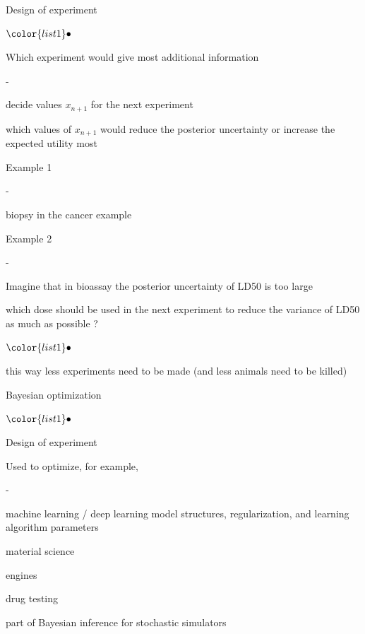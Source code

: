 \documentclass[t]{beamer}
\newenvironment{list1}{
   \begin{list}{$\color{list1}\bullet$}{\itemsep=6pt}}{
  \end{list}}
\newenvironment{list2}{
  \begin{list}{-}{\baselineskip=12pt\itemsep=2pt}}{
  \end{list}}
\begin{document}
\begin{frame}
  
  {\Large\color{navyblue} Design of experiment}

  \begin{list1}
  \item Which experiment would give most additional information
    \begin{list2}
    \item decide values $x_{n+1}$ for the next experiment
    \item which values of $x_{n+1}$ would reduce the posterior
      uncertainty or increase the expected utility most
    \end{list2}
  \item<2-> Example 1
    \begin{list2}
      \item biopsy in the cancer example
    \end{list2}
  \item<3-> Example 2
    \begin{list2}
    \item Imagine that in bioassay the posterior uncertainty of LD50 is too large
    \item which dose should be used in the next experiment to reduce
      the variance of LD50 as much as possible ?
      \begin{list1}
        \item this way less experiments need to be made (and less animals need to be killed)
      \end{list1}
    \end{list2}
  \end{list1}
\end{frame}

\begin{frame}
  
  {\Large\color{navyblue} Bayesian optimization}

  \begin{list1}
  \item Design of experiment
  \item Used to optimize, for example,
    \begin{list2}
    \item machine learning / deep learning model structures,
      regularization, and learning algorithm parameters
    \item material science
    \item engines
    \item drug testing
    \item part of Bayesian inference for stochastic simulators
    \end{list2}
  \end{list1}

\end{frame}
\end{document}
